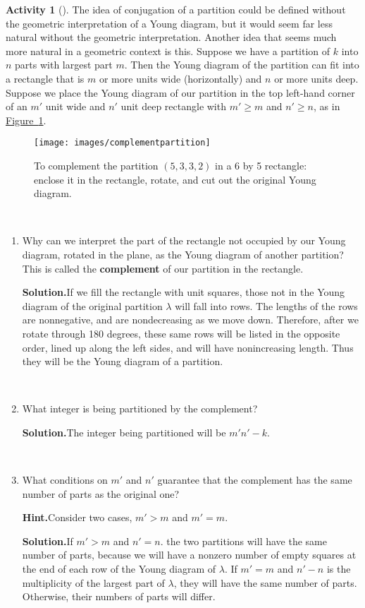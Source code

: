 \documentclass[10pt,]{book}
\newcommand{\terminology}[1]{\textbf{#1}}
\theoremstyle{plain}
\theoremstyle{definition}
\newtheorem{activity}[project]{Activity}
\numberwithin{equation}{chapter}
\newcommand{\gt}{>}
\begin{document}
\begin{activity}[]\label{activity-156}
The idea of conjugation of a partition could be defined without the geometric interpretation of a Young diagram, but it would seem far less natural without the geometric interpretation. Another idea that seems much more natural in a geometric context is this. Suppose we have a partition of \(k\) into \(n\) parts with largest part \(m\). Then the Young diagram of the partition can fit into a rectangle that is \(m\) or more units wide (horizontally) and \(n\) or more units deep. Suppose we place the Young diagram of our partition in the top left-hand corner of an \(m'\) unit wide and \(n'\) unit deep rectangle with \(m'\ge m\) and \(n' \ge n\), as in \hyperref[complementpartition]{Figure~\ref{complementpartition}}.%
\begin{figure}
\centering
\texttt{[image: images/complementpartition]}
\caption{To complement the partition \((5,3,3,2)\) in a 6 by 5 rectangle: enclose it in the rectangle, rotate, and cut out the original Young diagram.\label{complementpartition}}
\end{figure}
~\par
\begin{enumerate}[label=(\alph*)]
 \item Why can we interpret the part of the rectangle not occupied by our Young diagram, rotated in the plane, as the Young diagram of another partition? This is called the \terminology{complement} of our partition in the rectangle.%
\par\medskip\noindent%
\textbf{Solution.}\quad If we fill the rectangle with unit squares, those not in the Young diagram of the original partition \(\lambda\) will fall into rows.  The lengths of the rows are nonnegative, and are nondecreasing as we move down. Therefore, after we rotate through 180 degrees, these same rows will be listed in the opposite order, lined up along the left sides, and will have nonincreasing length. Thus they will be the Young diagram of a partition.%

~\par
\item What integer is being partitioned by the complement?%
\par\medskip\noindent%
\textbf{Solution.}\quad The integer being partitioned will be \(m'n'-k\).%

~\par
\item What conditions on \(m'\) and \(n'\) guarantee that the complement has the same number of parts as the original one?%
\par\medskip\noindent%
\textbf{Hint.}\quad Consider two cases, \(m' \gt m\) and \(m' = m\).%
\par\medskip\noindent%
\textbf{Solution.}\quad If \(m'>m\) and \(n'=n\). the two partitions will have the same number of parts, because we will have a nonzero number of empty squares at the end of each row of the Young diagram of \(\lambda\). If \(m'=m\) and \(n'-n\) is the multiplicity of the largest part of \(\lambda\), they will have the same number of parts. Otherwise, their numbers of parts will differ.%


\end{enumerate}
\end{activity}
\end{document}
